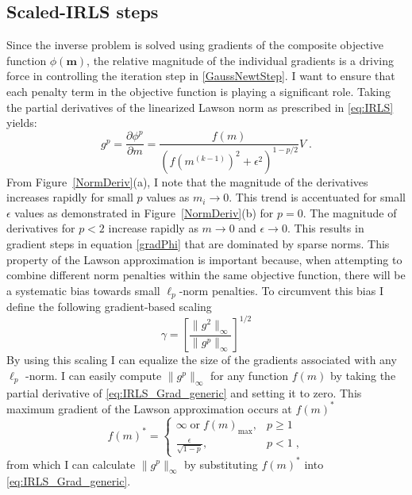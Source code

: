 \subsection{Scaled-IRLS steps}
Since the inverse problem is solved using gradients of the composite objective function $\phi(\mathbf{m})$, the relative magnitude of the individual gradients is a driving force in controlling the iteration step in \eqref{GaussNewtStep}. I want to ensure that each penalty term in the objective function is playing a significant role.
Taking the partial derivatives of the linearized Lawson norm as prescribed in \eqref{eq:IRLS} yields:
\begin{equation} \label{eq:IRLS_Grad_generic}
{g}^{p} = \frac{\partial \phi^{p}}{\partial {m}} = \frac{f(m)}{{{({f(m^{(k-1)})}^{2} + \epsilon^2 )}^{1-p/2}} }V\;.
\end{equation}
From Figure~\ref{NormDeriv}(a), I note that the magnitude of the derivatives increases rapidly for small $p$ values as $m_i \rightarrow 0$. This trend is accentuated for small $\epsilon$ values as demonstrated in Figure~\ref{NormDeriv}(b) for $p=0$. The magnitude of derivatives for $p<2$ increase rapidly as $m\rightarrow 0$ and $\epsilon\rightarrow 0$. This results in gradient steps in equation \eqref{gradPhi} that are dominated by sparse norms.
This property of the Lawson approximation is important because, when attempting to combine different norm penalties within the same objective function, there will be a systematic bias towards small $\ell_p$-norm penalties.
To circumvent this bias I define the following gradient-based scaling
\begin{equation}\label{gammaScale}
\gamma = \left[\frac{\|g^2\|_\infty}{\|g^p\|_\infty}\right]^{1/2}
\end{equation}
By using this scaling I can equalize the size of the gradients associated with any $\ell_p$ -norm.
I can easily compute $\|g^p\|_\infty$ for any function $f(m)$ by taking the partial derivative of \eqref{eq:IRLS_Grad_generic} and setting it to zero. This maximum gradient of the Lawson approximation occurs at ${f(m)^*}$
\begin{equation}\label{mMaxGrad}
f(m)^* =
\begin{cases}
\infty \;\text{or}\; f(m)_{\text{max}},& p \geq 1 \\
\frac{\epsilon}{\sqrt{1-p}} ,&p < 1 \;,
\end{cases}
\end{equation}
from which I can calculate $\|g^p\|_\infty$ by substituting ${f(m)^*}$ into \eqref{eq:IRLS_Grad_generic}.
